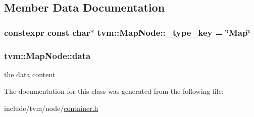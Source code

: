 \subsection{Member Data Documentation}
\subsubsection[{\texorpdfstring{\+\_\+type\+\_\+key}{_type_key}}]{\setlength{\rightskip}{0pt plus 5cm}constexpr const char$\ast$ tvm\+::\+Map\+Node\+::\+\_\+type\+\_\+key = \char`\"{}Map\char`\"{}\hspace{0.3cm}{\ttfamily [static]}}\hypertarget{classtvm_1_1MapNode_a789b3b6435184c1e01e6cb7e97e5e37d}{}\label{classtvm_1_1MapNode_a789b3b6435184c1e01e6cb7e97e5e37d}
\subsubsection[{\texorpdfstring{data}{data}}]{ tvm\+::\+Map\+Node\+::data}\hypertarget{classtvm_1_1MapNode_a5fe08f7ea603500f5f7ccc7e69979c78}{}\label{classtvm_1_1MapNode_a5fe08f7ea603500f5f7ccc7e69979c78}


the data content 



The documentation for this class was generated from the following file\+:\begin{DoxyCompactItemize}
\item 
include/tvm/node/\hyperlink{node_2container_8h}{container.\+h}\end{DoxyCompactItemize}
